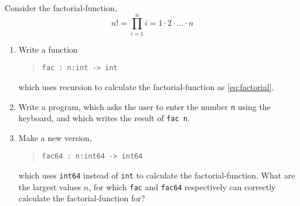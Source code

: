 Consider the factorial-function,
\begin{equation}
  n! = \prod_{i=1}^n i = 1\cdot 2\cdot \ldots \cdot n
  \label{eq:factorial}
\end{equation}
\begin{enumerate}
\item Write a function
  \begin{quote}
    \mbox{\lstinline!fac : n:int -> int!}
  \end{quote}
  which uses recursion to calculate the factorial-function as \eqref{eq:factorial}.
  \item Write a program, which asks the user to enter the number
    \lstinline!n! using the keyboard, and which writes the result of \lstinline!fac n!.
  \item Make a new version, 
    \begin{quote}
      \mbox{\lstinline!fac64 : n:int64 -> int64!}
    \end{quote}
    which uses \lstinline{int64} instead of \lstinline{int} to
    calculate the factorial-function. What are the largest values $n$,
    for which \lstinline{fac} and \lstinline{fac64} respectively can
    correctly calculate the factorial-function for?
  \end{enumerate}
